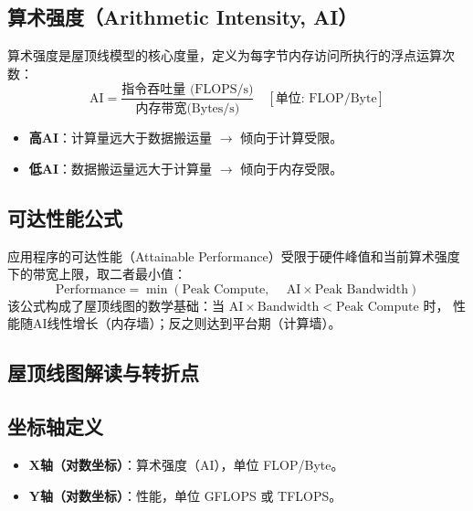 \subsection{算术强度（Arithmetic Intensity, AI）}
算术强度是屋顶线模型的核心度量，定义为每字节内存访问所执行的浮点运算次数：
\begin{equation}
    \text{AI} = \frac{\text{指令吞吐量 (FLOPS/s)}}
{\text{内存带宽(Bytes/s)}} \quad [\text{单位: FLOP/Byte}]
\end{equation}
\begin{itemize}
    \item \textbf{高AI}：计算量远大于数据搬运量 $\rightarrow$ 倾向于计算受限。
    \item \textbf{低AI}：数据搬运量远大于计算量 $\rightarrow$ 倾向于内存受限。
\end{itemize}

\subsection{可达性能公式}
应用程序的可达性能（Attainable Performance）受限于硬件峰值和当前算术强度下的带宽上限，取二者最小值：
\begin{equation}
    \text{Performance} = \min \left( \text{Peak Compute}
,\ \quad \text{AI} \times \text{Peak Bandwidth} \right)
\end{equation}
该公式构成了屋顶线图的数学基础：当 $\text{AI} \times \text{Bandwidth} < \text{Peak Compute}$ 时，
性能随AI线性增长（内存墙）；反之则达到平台期（计算墙）。

\subsection{屋顶线图解读与转折点}

\subsection{坐标轴定义}
\begin{itemize}
    \item \textbf{X轴（对数坐标）}：算术强度（AI），单位 FLOP/Byte。
    \item \textbf{Y轴（对数坐标）}：性能，单位 GFLOPS 或 TFLOPS。
\end{itemize}

